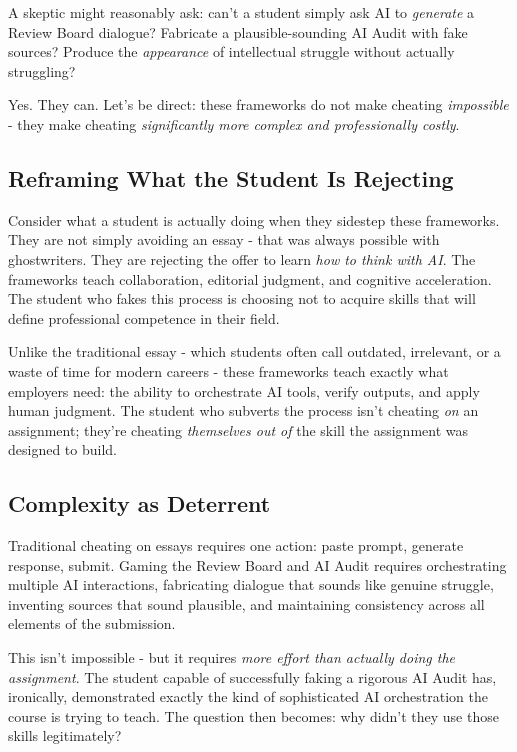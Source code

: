\documentclass[
  letterpaper,
  DIV=11,
  numbers=noendperiod]{scrreprt}
\begin{document}
A skeptic might reasonably ask: can't a student simply ask AI to
\emph{generate} a Review Board dialogue? Fabricate a plausible-sounding
AI Audit with fake sources? Produce the \emph{appearance} of
intellectual struggle without actually struggling?

Yes. They can. Let's be direct: these frameworks do not make cheating
\emph{impossible} - they make cheating \emph{significantly more complex
and professionally costly}.

\subsection{Reframing What the Student Is
Rejecting}\label{reframing-what-the-student-is-rejecting}

Consider what a student is actually doing when they sidestep these
frameworks. They are not simply avoiding an essay - that was always
possible with ghostwriters. They are rejecting the offer to learn
\emph{how to think with AI}. The frameworks teach collaboration,
editorial judgment, and cognitive acceleration. The student who fakes
this process is choosing not to acquire skills that will define
professional competence in their field.

Unlike the traditional essay - which students often call outdated,
irrelevant, or a waste of time for modern careers - these frameworks
teach exactly what employers need: the ability to orchestrate AI tools,
verify outputs, and apply human judgment. The student who subverts the
process isn't cheating \emph{on} an assignment; they're cheating
\emph{themselves out of} the skill the assignment was designed to build.

\subsection{Complexity as Deterrent}\label{complexity-as-deterrent}

Traditional cheating on essays requires one action: paste prompt,
generate response, submit. Gaming the Review Board and AI Audit requires
orchestrating multiple AI interactions, fabricating dialogue that sounds
like genuine struggle, inventing sources that sound plausible, and
maintaining consistency across all elements of the submission.

This isn't impossible - but it requires \emph{more effort than actually
doing the assignment}. The student capable of successfully faking a
rigorous AI Audit has, ironically, demonstrated exactly the kind of
sophisticated AI orchestration the course is trying to teach. The
question then becomes: why didn't they use those skills legitimately?
\end{document}
